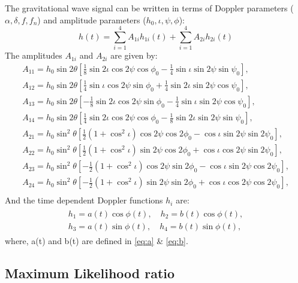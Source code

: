 \documentclass{ttuthes2007}
\begin{document}
The gravitational wave signal can be written in terms of Doppler
parameters ($\alpha, \delta, f, f_n $) and amplitude parameters ($h_0, \iota, \psi,
\phi$):
\begin{equation}
h(t) = \sum_{i=1}^{4}A_{1i} h_{1i}(t) + \sum_{i=1}^{4} A_{2i} h_{2i}(t)
\end{equation}
The amplitudes $A_{1i}$ and $A_{2i}$ are given by:
\begin{align*}
A_{11} = h_0 \sin{2\theta}\left[\frac{1}{8} \sin{2\iota}\cos{2\psi}\cos{\phi_0}-
\frac{1}{4}\sin{\iota} \sin{2\psi}\sin{\psi_0}\right], \\
A_{12} = h_0 \sin{2\theta}\left[\frac{1}{4} \sin{\iota}\cos{2\psi}\sin{\phi_0}+
\frac{1}{4}\sin{2\iota} \sin{2\psi}\cos{\psi_0}\right], \\
A_{13} = h_0 \sin{2\theta}\left[-\frac{1}{8} \sin{2\iota}\cos{2\psi}\sin{\phi_0}
-\frac{1}{4}\sin{\iota} \sin{2\psi}\cos{\psi_0}\right], \\
A_{14} = h_0 \sin{2\theta}\left[\frac{1}{4} \sin{2\iota}\cos{2\psi}\cos{\phi_0}-
\frac{1}{8}\sin{2\iota} \sin{2\psi}\sin{\psi_0}\right], \\
A_{21} = h_0 \sin^2{\theta}\left[\frac{1}{2}
(1+\cos^2{\iota})\cos{2\psi}\cos{2\phi_0}- \cos{\iota} \sin{2\psi}\sin{2\psi_0}\right], \\
A_{22} = h_0 \sin^2{\theta}\left[\frac{1}{2}
(1+\cos^2{\iota})\sin{2\psi}\cos{2\phi_0} + \cos{\iota} \cos{2\psi}\sin{2\psi_0}\right], \\
A_{23} = h_0 \sin^2{\theta}\left[-\frac{1}{2}
(1+\cos^2{\iota})\cos{2\psi}\sin{2\phi_0}- \cos{\iota} \sin{2\psi}\cos{2\psi_0}\right], \\
A_{24} = h_0 \sin^2{\theta}\left[-\frac{1}{2}
(1+\cos^2{\iota})\sin{2\psi}\sin{2\phi_0} + \cos{\iota} \cos{2\psi}\cos{2\psi_0}\right], \\
\end{align*}
And the time dependent Doppler functions $h_{i}$ are:
\begin{align}
\begin{split}\label{h}
h_{1}=a(t) \cos{\phi(t)},\quad h_{2}=b(t) \cos{\phi(t)},\\ 
h_{3}=a(t) \sin{\phi(t)},\quad h_{4}=b(t) \sin{\phi(t)}, 
\end{split}
\end{align}
where, a(t) and b(t) are defined in \ref{eq:a} \& \ref{eq:b}.



\subsection{Maximum Likelihood ratio}
\end{document}
